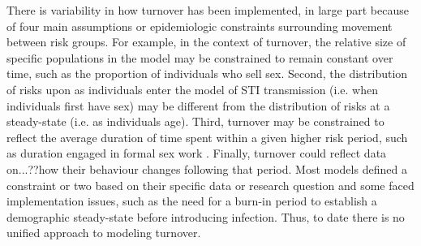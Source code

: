There is variability in how turnover has been implemented, 
in large part because of four main assumptions or epidemiologic  %
constraints surrounding movement between risk groups. %
For example, in the context of turnover, the relative 
size of specific populations in the model 
may be constrained to remain constant over time, such as the proportion of individuals
who sell sex.  %
Second, the distribution of risks upon as individuals enter the model of 
STI transmission (i.e. when individuals first have sex) may be different 
from the distribution of risks at a steady-state (i.e. as individuals age). %
Third, turnover may be constrained to reflect the average duration of time spent 
within a given higher risk period, such as duration engaged in formal sex work \citep{Watts2010}. %
Finally, turnover could reflect data on...??how their behaviour changes following that period. %
Most models defined a constraint or two based on their specific data or research question and 
some faced implementation issues, such as the need 
for a burn-in period to establish a demographic steady-state before introducing infection. %
Thus, to date there is no unified approach to modeling turnover.

